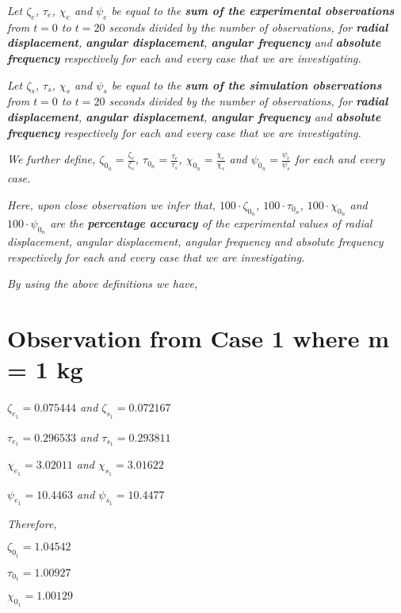 \textit{Let $\zeta_e$, $\tau_e$, $\chi_e$ and $\psi_e$ be equal to the \textbf{sum of the experimental observations} from $t = 0$ to $t = 20$ seconds divided by the number of observations, for \textbf{radial displacement}, \textbf{angular displacement}, \textbf{angular frequency} and \textbf{absolute frequency} respectively for each and every case that we are investigating.} 

\textit{Let $\zeta_s$, $\tau_s$, $\chi_s$ and $\psi_s$ be equal to the \textbf{sum of the simulation observations} from $t = 0$ to $t = 20$ seconds divided by the number of observations, for \textbf{radial displacement}, \textbf{angular displacement}, \textbf{angular frequency} and \textbf{absolute frequency} respectively for each and every case that we are investigating.}

\textit{We further define, $\zeta_{0_n} = \frac{\zeta_e}{\zeta_s}$, $\tau_{0_n} = \frac{\tau_e}{\tau_s}$, $\chi_{0_n} = \frac{\chi_e}{\chi_s}$ and $\psi_{0_n} = \frac{\psi_e}{\psi_s}$ for each and every case.}

\textit{Here, upon close observation we infer that, $100\cdot\zeta_{0_n}$, $100\cdot\tau_{0_n}$, $100\cdot\chi_{0_n}$ and $100\cdot\psi_{0_n}$ are the \textbf{percentage accuracy} of the experimental values of radial displacement, angular displacement, angular frequency and absolute frequency respectively for each and every case that we are investigating.}

\textit{By using the above definitions we have,}

\section{{Observation from Case 1 where m = 1 kg}}
        
    \textit{$\zeta_{e_1} = 0.075444$ and $\zeta_{s_1} = 0.072167$}
            
    \textit{$\tau_{e_1} = 0.296533$ and $\tau_{s_1} = 0.293811$}
            
    \textit{$\chi_{e_1} = 3.02011$ and $\chi_{s_1} = 3.01622$}
            
    \textit{$\psi_{e_1} = 10.4463$ and $\psi_{s_1} = 10.4477$}
            
    \textit{Therefore,}
            
    $\zeta_{0_1} = 1.04542$
            
    $\tau_{0_1} = 1.00927$
            
    $\chi_{0_1} = 1.00129$
            
